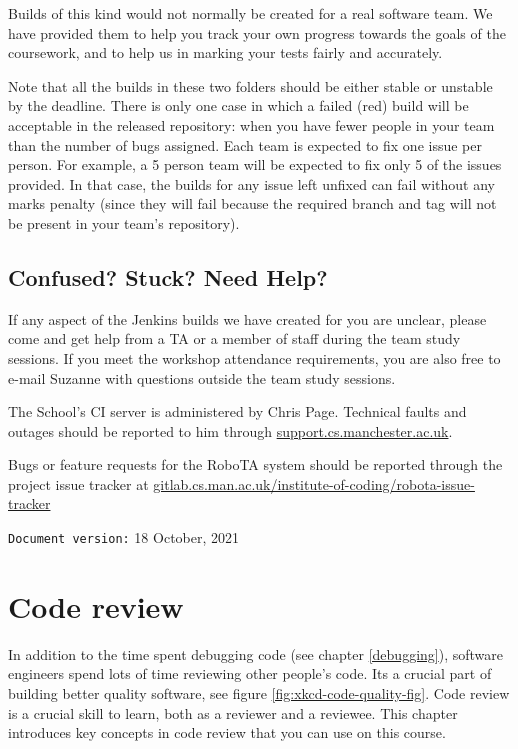 \documentclass[
]{book}
\begin{document}
Builds of this kind would not normally be created for a real software team. We have provided them to help you track your own progress towards the goals of the coursework, and to help us in marking your tests fairly and accurately.

Note that all the builds in these two folders should be either stable or unstable by the deadline. There is only one case in which a failed (red) build will be acceptable in the released repository: when you have fewer people in your team than the number of bugs assigned. Each team is expected to fix one issue per person. For example, a 5 person team will be expected to fix only 5 of the issues provided. In that case, the builds for any issue left unfixed can fail without any marks penalty (since they will fail because the required branch and tag will not be present in your team's repository).

\hypertarget{confused}{%
\section{Confused? Stuck? Need Help?}\label{confused}}

If any aspect of the Jenkins builds we have created for you are unclear, please come and get help from a TA or a member of staff during the team study sessions. If you meet the workshop attendance requirements, you are also free to e-mail Suzanne with questions outside the team study sessions.

The School's CI server is administered by Chris Page. Technical faults and outages should be reported to him through \href{https://support.cs.manchester.ac.uk}{support.cs.manchester.ac.uk}.

Bugs or feature requests for the RoboTA system should be reported through the project issue tracker at \href{https://gitlab.cs.man.ac.uk/institute-of-coding/robota-issue-tracker}{gitlab.cs.man.ac.uk/institute-of-coding/robota-issue-tracker}

\texttt{Document\ version:} 18 October, 2021

\hypertarget{reviewing}{%
\chapter{Code review}\label{reviewing}}

In addition to the time spent debugging code (see chapter \ref{debugging}), software engineers spend lots of time reviewing other people's code. Its a crucial part of building better quality software, see figure \ref{fig:xkcd-code-quality-fig}. Code review is a crucial skill to learn, both as a reviewer and a reviewee. This chapter introduces key concepts in code review that you can use on this course.
\end{document}
